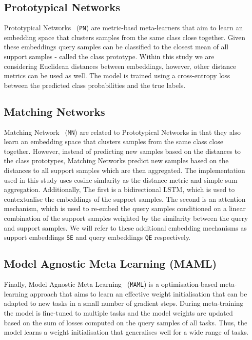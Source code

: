 \subsection{Prototypical Networks}

Prototypical Networks~\cite{protonet} (\texttt{PN}) are metric-basd meta-learners that aim to learn an embedding space that clusters samples from the same class close together. Given these embeddings
query samples can be classified to the closest mean of all support samples - called the class prototype. Within this study we are considering Euclidean distances between embeddings, however, other distance metrics can be used as well. The model is trained using a cross-entropy loss between the predicted class probabilities and the true labels.

\subsection{Matching Networks}

Matching Network~\cite{matchingnet} (\texttt{MN}) are related to Prototypical Networks in that they also learn an embedding space that clusters samples from the same class close together. However, instead of predicting new samples based on the distances to the class prototypes, Matching Networks predict new samples based on the distances to all support samples which are then aggregated. The implementation used in this study uses cosine simlarity as the distance metric and simple sum aggregation. Additionally, 
The first is a bidirectional LSTM, which is used to contextualise the embeddings of the support samples. 
The second is an attention mechanism, which is used to re-embed the query samples conditioned on a linear combination of the support samples weighted by the similarity between the query and support samples. We will refer to these additional embedding mechanisms as support embeddings \texttt{SE} and query embeddings \texttt{QE} respectively.


\subsection{Model Agnostic Meta Learning (MAML)}

Finally, Model Agnostic Meta Learning~\cite{maml} (\texttt{MAML}) is a optimisation-based meta-learning approach that aims to learn an effective weight initialisation that can be adapted to new tasks in a small number of gradient steps. During meta-training the model is fine-tuned to multiple tasks and the model weights are updated based on the sum of losses computed on the query samples of all tasks. Thus, the model learns a weight initialisation that generalises well for a wide range of tasks. 

